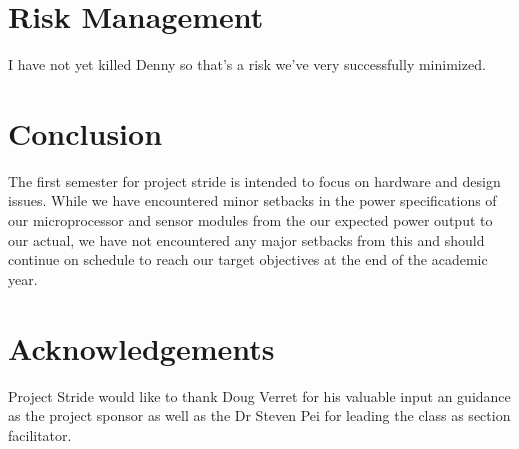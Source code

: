 \documentclass[letterpaper, 12 pt, onecolumn, hidelinks]{ieeetran}
\begin{document}
\section{Risk Management}\label{sec:Risk}
I have not yet killed Denny so that's a risk we've very successfully minimized.

\section{Conclusion}\label{sec:Conclusion}
The first semester for project stride is intended to focus on hardware and design issues. While we have encountered minor setbacks in the power specifications of our microprocessor and sensor modules from the our expected power output to our actual, we have not encountered any major setbacks from this and should continue on schedule to reach our target objectives at the end of the academic year.
    
\section*{Acknowledgements}
Project Stride would like to thank Doug Verret for his valuable input an guidance as the project sponsor as well as the Dr Steven Pei for leading the class as section facilitator.
\end{document}
